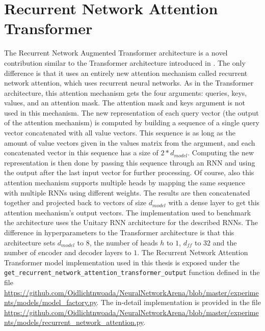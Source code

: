 \documentclass[draft,final]{vutinfth} %
\begin{document}
    \section{Recurrent Network Attention Transformer} \label{rnatt}
    The Recurrent Network Augmented Transformer architecture is a novel contribution similar to the Transformer architecture introduced in .
    The only difference is that it uses an entirely new attention mechanism called recurrent network attention, which uses recurrent neural networks.
    As in the Transformer architecture, this attention mechanism gets the four arguments: queries, keys, values, and an attention mask.
    The attention mask and keys argument is not used in this mechanism.
    The new representation of each query vector (the output of the attention mechanism) is computed by building a sequence of a single query vector concatenated with all value vectors.
    This sequence is as long as the amount of value vectors given in the values matrix from the argument, and each concatenated vector in this sequence has a size of $2*d_{model}$.
    Computing the new representation is then done by passing this sequence through an RNN and using the output after the last input vector for further processing.
    Of course, also this attention mechanism supports multiple heads by mapping the same sequence with multiple RNNs using different weights.
    The results are then concatenated together and projected back to vectors of size $d_{model}$ with a dense layer to get this attention mechanism's output vectors.
    The implementation used to benchmark the architecture uses the Unitary RNN architecture for the described RNNs.
    The difference in hyperparameters to the Transformer architecture is that this architecture sets $d_{model}$ to $8$, the number of heads $h$ to $1$, $d_{ff}$ to $32$ and the number of encoder and decoder layers to $1$.
    The Recurrent Network Attention Transformer model implementation used in this thesis is exposed under the \texttt{get\_recurrent\_network\_attention\_transformer\_output} function defined in the file \url{https://github.com/Oidlichtnwoada/NeuralNetworkArena/blob/master/experiments/models/model_factory.py}.
    The in-detail implementation is provided in the file \url{https://github.com/Oidlichtnwoada/NeuralNetworkArena/blob/master/experiments/models/recurrent_network_attention.py}.
\end{document}
